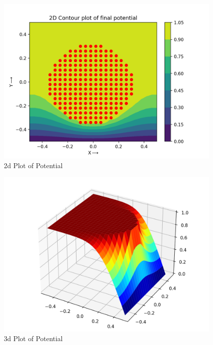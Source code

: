 \documentclass[11pt, a4paper]{article}
\begin{document}
\begin{figure}[h!]
\centering
\includegraphics[scale=0.6]{Fig-5.png}
\caption{2d Plot of Potential}
\label{fig:3d Plot of Potential}
\end{figure}


\begin{figure}[h!]
\centering
\includegraphics[scale=0.6]{Fig-6.png}
\caption{3d Plot of Potential}
\label{fig:2d Plot of Potential}
\end{figure}
\end{document}
